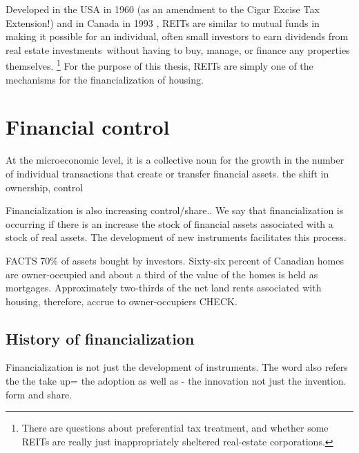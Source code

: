 Developed in the USA  in 1960 (as an amendment to the Cigar Excise Tax Extension!) and in Canada in 1993 \cite{GET_REITsDevelopedDates}, REITs are similar to mutual funds in making it possible for an individual, often small investors to earn dividends from real estate investments without having to buy, manage, or finance any properties themselves. 
\footnote{There are questions about preferential tax treatment, and whether some REITs are really just inappropriately sheltered real-estate corporations. } For the purpose of this thesis, REITs are simply one of the mechanisms for the financialization of housing.

\section{Financial control}
At the microeconomic level, it is a collective noun for the growth in the number of individual transactions that create or transfer financial assets. 
the shift in ownership, control

Financialization is also increasing control/share..
We say that financialization is occurring if there is an increase the stock of financial assets associated with a stock of real assets. The development of new instruments facilitates this process. 

FACTS 70\% of assets bought by investors.
Sixty-six percent of Canadian homes are owner-occupied and about a third of the value of the homes is held as mortgages. Approximately two-thirds of the net land rents associated with housing, therefore, accrue to owner-occupiers \cite{nemtinFinancializationHousingSocial2021} CHECK. %


\subsection{History of financialization}

Financialization is not just the development of instruments. 
The word also refers the the take up= the adoption as well as - the innovation not just the invention.
form and share. 

